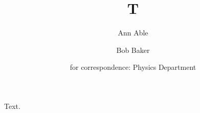 \documentclass{article}
\title{T}
\author[1]{Ann Able}
\author[2]{Bob Baker}
\author{for correspondence: Physics Department}
\affil[1]{MIT}
\affil[2]{Duke University}
\begin{document}
\maketitle
Text.
\end{document}
